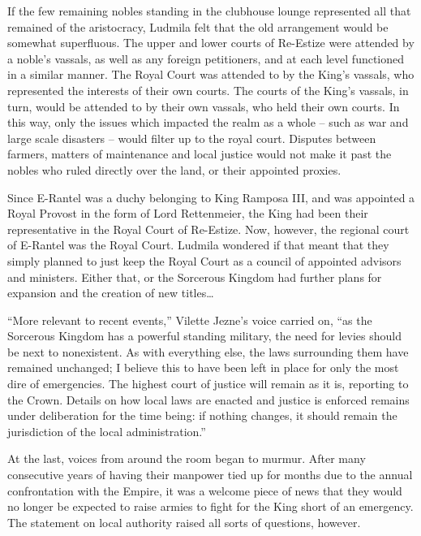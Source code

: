  

If the few remaining nobles standing in the clubhouse lounge represented all that remained of the aristocracy, Ludmila felt that the old arrangement would be somewhat superfluous. The upper and lower courts of Re-Estize were attended by a noble’s vassals, as well as any foreign petitioners, and at each level functioned in a similar manner. The Royal Court was attended to by the King’s vassals, who represented the interests of their own courts. The courts of the King’s vassals, in turn, would be attended to by their own vassals, who held their own courts. In this way, only the issues which impacted the realm as a whole – such as war and large scale disasters – would filter up to the royal court. Disputes between farmers, matters of maintenance and local justice would not make it past the nobles who ruled directly over the land, or their appointed proxies.

 

Since E-Rantel was a duchy belonging to King Ramposa III, and was appointed a Royal Provost in the form of Lord Rettenmeier, the King had been their representative in the Royal Court of Re-Estize. Now, however, the regional court of E-Rantel was the Royal Court. Ludmila wondered if that meant that they simply planned to just keep the Royal Court as a council of appointed advisors and ministers. Either that, or the Sorcerous Kingdom had further plans for expansion and the creation of new titles…

 

“More relevant to recent events,” Vilette Jezne’s voice carried on, “as the Sorcerous Kingdom has a powerful standing military, the need for levies should be next to nonexistent. As with everything else, the laws surrounding them have remained unchanged; I believe this to have been left in place for only the most dire of emergencies. The highest court of justice will remain as it is, reporting to the Crown. Details on how local laws are enacted and justice is enforced remains under deliberation for the time being: if nothing changes, it should remain the jurisdiction of the local administration.”

 

At the last, voices from around the room began to murmur. After many consecutive years of having their manpower tied up for months due to the annual confrontation with the Empire, it was a welcome piece of news that they would no longer be expected to raise armies to fight for the King short of an emergency. The statement on local authority raised all sorts of questions, however.

